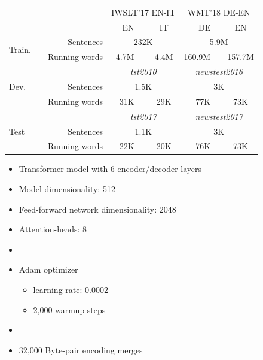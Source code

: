 \documentclass[11pt, a4paper, landscape]{article}
\begin{document}
\NewPage
{}
\vfill
\begin{table}
\small
\bf
\begin{center}
  \begin{tabular}{lp{1cm}r|rp{0.05cm}c|rp{0.05cm}c}
    & & & \multicolumn{3}{c|}{IWSLT'17 EN-IT} & \multicolumn{3}{c}{WMT'18 DE-EN} \\
    & & & EN && IT & DE && EN \\
    \toprule
    \multirow{2}{*}{Train.} & & Sentences & \multicolumn{3}{c|}{232K} & \multicolumn{3}{c}{5.9M} \\
    & & Running words & 4.7M && 4.4M & 160.9M && 157.7M \\
    \midrule
    \multirow{3}{*}{Dev.} & & & \multicolumn{3}{c|}{\textit{tst2010}} & \multicolumn{3}{c}{\textit{newstest2016}} \\
    & & Sentences & \multicolumn{3}{c|}{1.5K} & \multicolumn{3}{c}{3K} \\
    & & Running words & 31K && 29K & 77K && 73K \\
    \midrule
    \multirow{3}{*}{Test} & & & \multicolumn{3}{c|}{\textit{tst2017}} & \multicolumn{3}{c}{\textit{newstest2017}} \\
    & & Sentences & \multicolumn{3}{c|}{1.1K} & \multicolumn{3}{c}{3K} \\
    & & Running words & 22K && 20K & 76K && 73K \\
  \end{tabular}
\end{center}
\end{table}
\vfill

\NewPage
{}
\vfill
\begin{itemize}
	\item Transformer model \cite{vaswani} with 6 encoder/decoder layers
	\item Model dimensionality: 512
	\item Feed-forward network dimensionality: 2048
	\item Attention-heads: 8
	\item[]
	\item Adam optimizer \cite{adam}
	\begin{itemize}
		\item learning rate: 0.0002
		\item 2,000 warmup steps
	\end{itemize}
	\item[]
	\item 32,000 Byte-pair encoding merges \cite{bpe}
\end{itemize}
\vfill
\end{document}
